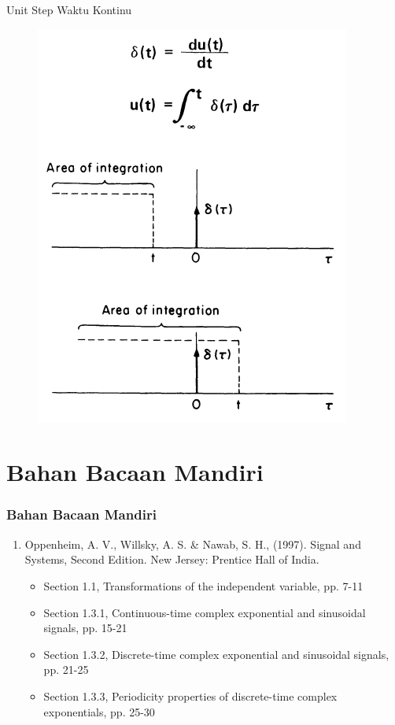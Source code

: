 \documentclass[pdflatex,compress,mathserif]{beamer}
\begin{document}
\begin{frame}{Unit Step Waktu Kontinu}
	\begin{figure}
		\centering
		\includegraphics[height=0.8\textheight]{img/02.slide_08}
	\end{figure}
\end{frame}

\section{Bahan Bacaan Mandiri}

\begin{frame}
	\frametitle{Bahan Bacaan Mandiri}
	\begin{enumerate}
		\item Oppenheim, A. V., Willsky, A. S. \& Nawab, S. H., (1997). Signal and Systems, Second Edition. New Jersey: Prentice Hall of India.
		\begin{itemize}
			\item Section 1.1, Transformations of the independent variable, pp. 7-11
			\item Section 1.3.1, Continuous-time complex exponential and sinusoidal signals, pp. 15-21
			\item Section 1.3.2, Discrete-time complex exponential and sinusoidal signals, pp. 21-25
			\item Section 1.3.3, Periodicity properties of discrete-time complex exponentials, pp. 25-30
		\end{itemize}
	\end{enumerate}
\end{frame}
\end{document}
